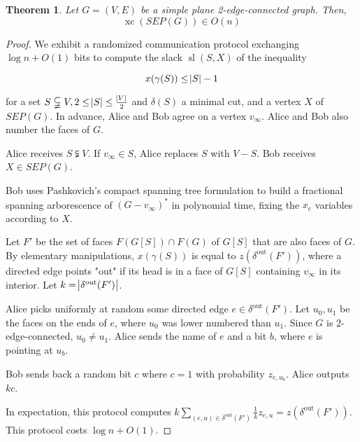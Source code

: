 \documentclass{article}
\newtheorem{theorem}{Theorem}
\DeclareMathOperator{\xc}{xc}
\DeclareMathOperator{\Sl}{sl}
\begin{document}
	\begin{theorem}
	Let $G=(V,E)$ be a simple plane 2-edge-connected graph. Then,
		$$\xc(SEP(G)) \in O(n)$$
	\end{theorem}
\begin{proof}
	We exhibit a randomized communication protocol exchanging
	$\log n + O(1)$ bits to compute the slack $\Sl(S, X)$ of the
	inequality

	$$x(\gamma(S)) \leq \abs{S}-1$$

	for a set $S\subsetneqq V, 2\leq \abs{S} \leq \frac{\abs{V}}{2}$
	and $\delta(S)$ a minimal cut,
	and a vertex $X$ of $SEP(G)$.
	In advance, Alice and Bob agree on a vertex $v_\infty$.
	Alice and Bob also number the faces of $G$.
	
	Alice receives $S\subsetneqq V$. 
	If $v_\infty\in S$, Alice replaces $S$ with $V-S$.
	Bob receives $X\in SEP(G)$.

	Bob uses Pashkovich's compact spanning tree formulation to build 
	a fractional spanning arborescence of $(G-v_\infty)^*$
	in polynomial time, fixing the $x_e$ variables according to $X$.

	Let $F'$ be the set of faces $F(G[S])\cap F(G)$ 
	of  $G[S]$ that are also faces of $G$.
	By elementary manipulations, $x(\gamma(S))$ is equal to $z(\delta^{\text{out}}(F'))$, where a directed edge points "out" if its head is in a face of $G[S]$
	containing $v_\infty$ in its interior.
	Let $k=\abs{\delta^{\text{out}}(F')}$.

	Alice picks uniformly at random some directed edge $e\in \delta^{\text{out}}(F')$. 
	Let $u_0,u_1$ be the faces on the ends of $e$, where
	$u_0$ was lower numbered than $u_1$. Since
	$G$ is 2-edge-connected, $u_0\neq u_1$.
	Alice sends
	the name of $e$ and a bit $b$, where $e$ is pointing at $u_b$.

	Bob sends back a random bit $c$ where $c=1$ with probability $z_{e,u_b}$.
	Alice outputs $kc$.

	In expectation, this protocol computes $k\sum_{(e,u)\in\delta^{\text{out}}(F')} \frac{1}{k} z_{e,u} = z(\delta^{\text{out}}(F'))$. This protocol costs $\log n + O(1)$.
\end{proof}
\end{document}
